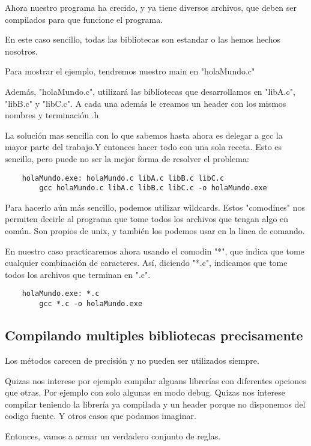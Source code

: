 \documentclass[]{article}
\begin{document}
	Ahora nuestro programa ha crecido, y ya tiene diversos archivos, que deben ser compilados para que funcione el programa. 
	
	En este caso sencillo, todas las bibliotecas son estandar o las hemos hechos nosotros.
	
	Para mostrar el ejemplo, tendremos nuestro main en "holaMundo.c"
	
	Además, "holaMundo.c", utilizará las bibliotecas que desarrollamos en "libA.c", "libB.c" y "libC.c". A cada una además le creamos un header con los mismos nombres y terminación .h
	
	La solución mas sencilla con lo que sabemos hasta ahora es delegar a gcc la mayor parte del trabajo.Y entonces hacer todo con una sola receta. Esto es sencillo, pero puede no ser la mejor forma de resolver el problema:
	
	\begin{lstlisting}
	holaMundo.exe: holaMundo.c libA.c libB.c libC.c
		gcc holaMundo.c libA.c libB.c libC.c -o holaMundo.exe 
	\end{lstlisting}
	
	Para hacerlo aún más sencillo, podemos utilizar wildcards. Estos "comodines" nos permiten decirle al programa que tome todos los archivos que tengan algo en común. Son propios de unix, y también los podemos usar en la linea de comando.
	
	En nuestro caso practicaremos ahora usando el comodin "*", que indica que tome cualquier combinación de caracteres. Así, diciendo "*.c", indicamos que tome todos los archivos que terminan en ".c".
	
	\begin{lstlisting}
	holaMundo.exe: *.c
		gcc *.c -o holaMundo.exe 
	\end{lstlisting}
	
	
	\subsection{Compilando multiples bibliotecas precisamente}
	
	Los métodos carecen de precisión y no pueden ser utilizados siempre.
	
	Quizas nos interese por ejemplo compilar alguans librerías con diferentes opciones que otras. Por ejemplo con solo algunas en modo debug. Quizas nos interese compilar teniendo la librería ya compilada y un header porque no disponemos del codigo fuente. Y otros casos que podamos imaginar.
	
	Entonces, vamos a armar un verdadero conjunto de reglas.
	
\end{document}
